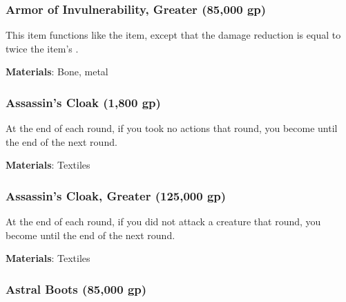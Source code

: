 \lowercase{\hypertarget{item:Armor of Invulnerability, Greater}{}}\label{item:Armor of Invulnerability, Greater}
\hypertarget{item:Armor of Invulnerability, Greater}{\subsubsection{Armor of Invulnerability, Greater\hfill{} (85,000 gp)}}

This item functions like the  item, except that the damage reduction is equal to twice the item's .



\vspace{0.25em}
\textbf{Materials}: Bone, metal


\lowercase{\hypertarget{item:Assassin's Cloak}{}}\label{item:Assassin's Cloak}
\hypertarget{item:Assassin's Cloak}{\subsubsection{Assassin's Cloak\hfill{} (1,800 gp)}}

At the end of each round, if you took no actions that round, you become  until the end of the next round.



\vspace{0.25em}
\textbf{Materials}: Textiles


\lowercase{\hypertarget{item:Assassin's Cloak, Greater}{}}\label{item:Assassin's Cloak, Greater}
\hypertarget{item:Assassin's Cloak, Greater}{\subsubsection{Assassin's Cloak, Greater\hfill{} (125,000 gp)}}

At the end of each round, if you did not attack a creature that round, you become  until the end of the next round.



\vspace{0.25em}
\textbf{Materials}: Textiles


\lowercase{\hypertarget{item:Astral Boots}{}}\label{item:Astral Boots}
\hypertarget{item:Astral Boots}{\subsubsection{Astral Boots\hfill{} (85,000 gp)}}

